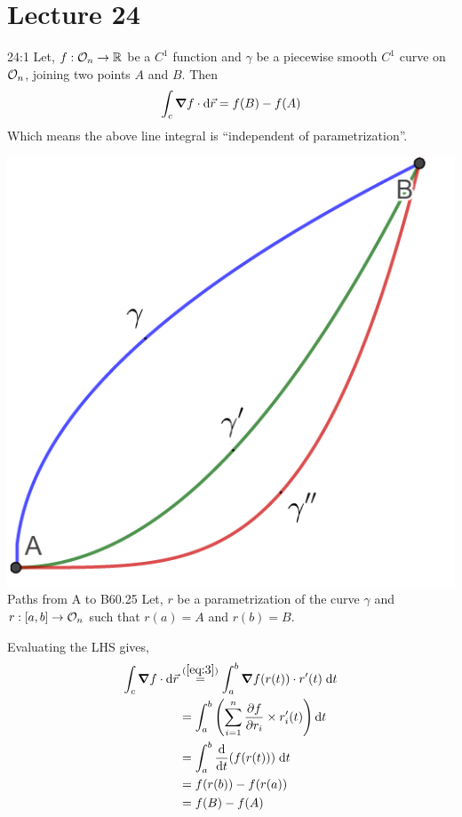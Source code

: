 \documentclass[../Analysis-3.tex]{subfiles}
\begin{document}
\chapter*{Lecture 24} %
\setcounter{chapter}{24} %
\setcounter{section}{0}
\setcounter{equation}{0}
\setcounter{figure}{0}


\begin{Thm}{}{24:1}
  Let, $f: \mathcal{O}_{n} \to \mathbb{R}$ be a $C^1$ function and $\gamma$ be a piecewise smooth $C^1$ curve on $\mathcal{O}_{n}$, joining two points $A$ and $B$. Then
  \[\int_c \grad f\cdot \dd\vec{r} = f(B)-f(A)\]
  Which means the above line integral is ``independent of parametrization''.
\end{Thm}


\begin{proofFig}{\includegraphics[width=.78\linewidth]{../figures/lec-24.1.png}}{Paths from A to B}{\label{path:AtoB}}{6}{0.25\textwidth}
  Let, $r$ be a parametrization of the curve $\gamma$ and $r :[a,b] \to \mathcal{O}_{n}$ such that $r(a)=A$ and $r(b)=B$.

  Evaluating the LHS gives,
  \begin{align*}
    \int_c \grad f\cdot \dd\vec{r}
     & \overset{(\ref{eq:3})}{=} \int_a^b \grad f(r(t)) \cdot r'(t) \; \dd t    \\
     & = \int_a^b \left(\sum_{i=1}^{n} \pdv{f}{r_i}\times r_i'(t) \right) \dd t \\
     & =\int_a^b \dv{t}(f(r(t))) \; \dd t                                       \\
     & = f(r(b)) - f(r(a))                                                      \\
     & = f(B) - f(A)
  \end{align*}
\end{proofFig}
\end{document}
